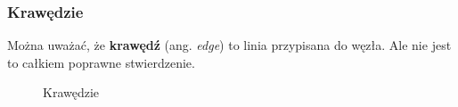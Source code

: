 \documentclass[10pt,t]{beamer}
\begin{document}
\begin{frame}
  \frametitle{Krawędzie}


  Można uważać, że \textbf{krawędź} (ang. \textit{edge}) to linia
  przypisana do węzła. Ale nie jest to całkiem poprawne stwierdzenie.





  \begin{figure}

    \centering


    \begin{tikzpicture}







    \end{tikzpicture}


    \caption{Krawędzie}

  \end{figure}

\end{frame}
\end{document}
